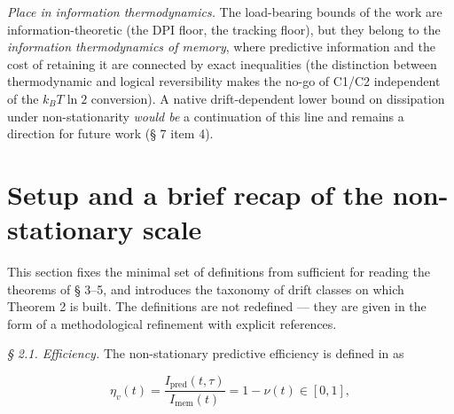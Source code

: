 \documentclass[12pt]{iopart}
\begin{document}
\emph{Place in information thermodynamics.} The load-bearing bounds of the work are information-theoretic (the DPI floor, the tracking floor), but they belong to the \emph{information thermodynamics of memory}, where predictive information and the cost of retaining it are connected by exact inequalities \cite{Still2012,HartichBaratoSeifert2014,Sagawa2014,Parrondo2015} (the distinction between thermodynamic and logical reversibility \cite{Sagawa2014} makes the no-go of C1/C2 independent of the \(k_B T\ln 2\) conversion). A native drift-dependent lower bound on dissipation under non-stationarity \emph{would be} a continuation of this line and remains a direction for future work (§ 7 item 4).



\section{Setup and a brief recap of the non-stationary scale}\label{setup-and-a-brief-recap-of-the-non-stationary-scale}



This section fixes the minimal set of definitions from \cite{Andriishin2026b} sufficient for reading the theorems of § 3--5, and introduces the taxonomy of drift classes on which Theorem 2 is built. The definitions are not redefined --- they are given in the form of a methodological refinement with explicit references.



\emph{§ 2.1. Efficiency.} The non-stationary predictive efficiency is defined in \cite{Andriishin2026b} as



\[\eta_v(t) = \frac{I_{\text{pred}}(t,\tau)}{I_{\text{mem}}(t)} = 1 - \nu(t) \in [0,1],\]
\end{document}
